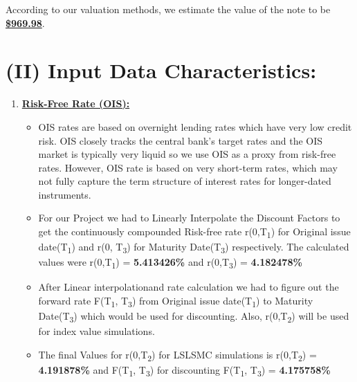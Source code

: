 \documentclass[12pt,a4paper]{article}
\begin{document}
\vspace{0.5cm}
According to our valuation methods, we estimate the value of the note to be \underline{\textbf{\$969.98}}.

\clearpage  %

\section*{(II) Input Data Characteristics:}
\begin{enumerate}
\label{app:ois}
\item \underline{\textbf{Risk-Free Rate (OIS):}}
	\begin{itemize}
	\item  OIS rates are based on overnight lending rates which have very low credit risk. OIS closely tracks the central bank's target rates and the OIS market is typically very liquid so we use OIS as a proxy from risk-free rates. However, OIS rate is based on very short-term rates, which may not fully capture the term structure of interest rates for longer-dated instruments.
	\item For our Project we had to Linearly Interpolate the Discount Factors to get the continuously compounded Risk-free rate r(0,T\textsubscript{1}) for Original issue date(T\textsubscript{1}) and  r(0, T\textsubscript{3}) for Maturity Date(T\textsubscript{3}) respectively. The calculated values were r(0,T\textsubscript{1}) = \textbf{5.413426\%} and r(0,T\textsubscript{3}) = \textbf{4.182478\%}
	\item After Linear interpolationand rate calculation we had to figure out the forward rate F(T\textsubscript{1}, T\textsubscript{3}) from Original issue date(T\textsubscript{1}) to Maturity Date(T\textsubscript{3}) which would be used for discounting. Also, r(0,T\textsubscript{2}) will be used for index value simulations.
	\item The final Values for  r(0,T\textsubscript{2})  for LSLSMC simulations is r(0,T\textsubscript{2}) = \textbf{4.191878\%} and  F(T\textsubscript{1}, T\textsubscript{3}) for discounting  F(T\textsubscript{1}, T\textsubscript{3}) = \textbf{4.175758\%}
	\end{itemize}




\end{enumerate}
\end{document}
